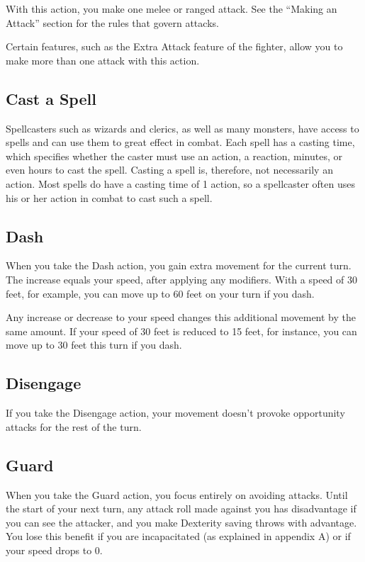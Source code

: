With this action, you make one melee or ranged attack. See the “Making an Attack” section for the rules that govern attacks.

Certain features, such as the Extra Attack feature of the fighter, allow you to make more than one attack with this action.

\subsection{Cast a Spell}

Spellcasters such as wizards and clerics, as well as many monsters, have access to spells and can use them to great effect in combat. Each spell has a casting time, which specifies whether the caster must use an action, a reaction, minutes, or even hours to cast the spell. Casting a spell is, therefore, not necessarily an action. Most spells do have a casting time of 1 action, so a spellcaster often uses his or her action in combat to cast such a spell.

\subsection{Dash}

When you take the Dash action, you gain extra movement for the current turn. The increase equals your speed, after applying any modifiers. With a speed of 30 feet, for example, you can move up to 60 feet on your turn if you dash.

Any increase or decrease to your speed changes this additional movement by the same amount. If your speed of 30 feet is reduced to 15 feet, for instance, you can move up to 30 feet this turn if you dash.

\subsection{Disengage}

If you take the Disengage action, your movement doesn't provoke opportunity attacks for the rest of the turn.

\subsection{Guard}

When you take the Guard action, you focus entirely on avoiding attacks. Until the start of your next turn, any attack roll made against you has disadvantage if you can see the attacker, and you make Dexterity saving throws with advantage. You lose this benefit if you are incapacitated (as explained in appendix A) or if your speed drops to 0.

